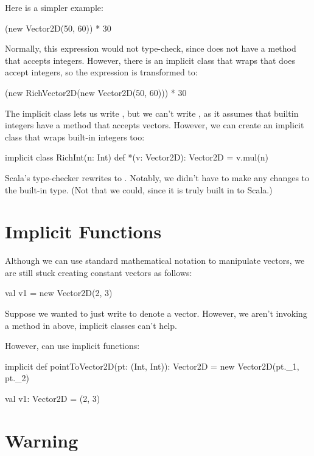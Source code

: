 \documentclass[9pt]{extbook}
\begin{document}
Here is a simpler example:
\begin{scalacode}
(new Vector2D(50, 60)) * 30
\end{scalacode}
Normally, this expression would not type-check, since 
does not have a method \scalainline{*} that accepts integers. However, there is
an implicit class that wraps  that does accept
integers, so the expression is transformed to:
\begin{scalacode}
(new RichVector2D(new Vector2D(50, 60))) * 30
\end{scalacode}

The  implicit class lets us write
, but we can't write
, as it assumes that builtin
integers have a \scalainline{*} method that accepts vectors. However,
we can create an implicit class that wraps built-in integers too:

\begin{scalacode}
implicit class RichInt(n: Int) {
  def *(v: Vector2D): Vector2D = v.mul(n)
}
\end{scalacode}

Scala's type-checker rewrites  to .
Notably, we didn't have to make any changes to the built-in 
type. (Not that we could, since it is truly built in to Scala.)

\section{Implicit Functions}

Although we can use standard mathematical notation to manipulate
vectors, we are still stuck creating constant vectors as follows:
\begin{scalacode}
val v1 = new Vector2D(2, 3)
\end{scalacode}
Suppose we wanted to just write  to denote a vector.
However, we aren't invoking a method in above, implicit classes can't help.

However, can use implicit functions:
\begin{scalacode}
implicit def pointToVector2D(pt: (Int, Int)): Vector2D = {
  new Vector2D(pt._1, pt._2)
}

val v1: Vector2D = (2, 3)
\end{scalacode}

\section{Warning}
\end{document}
